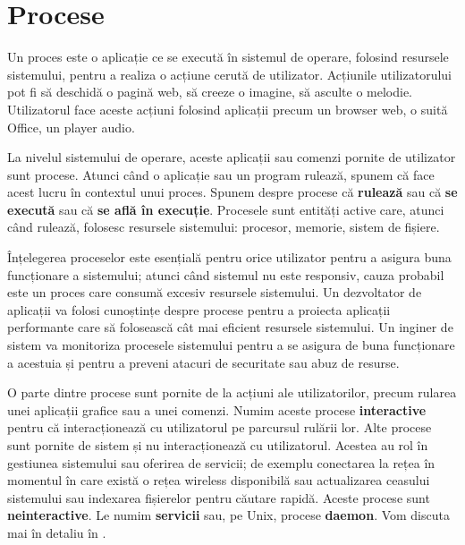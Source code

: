
\chapter{Procese}
\label{ch:process}

Un proces este o aplicație ce se execută în sistemul de operare, folosind resursele sistemului, pentru a realiza o acțiune cerută de utilizator.
Acțiunile utilizatorului pot fi să deschidă o pagină web, să creeze o imagine, să asculte o melodie.
Utilizatorul face aceste acțiuni folosind aplicații precum un browser web, o suită Office, un player audio.

La nivelul sistemului de operare, aceste aplicații sau comenzi pornite de utilizator sunt procese.
Atunci când o aplicație sau un program rulează, spunem că face acest lucru în contextul unui proces.
Spunem despre procese că \textbf{rulează} sau că \textbf{se execută} sau că \textbf{se află în execuție}.
Procesele sunt entități active care, atunci când rulează, folosesc resursele sistemului: procesor, memorie, sistem de fișiere.

Înțelegerea proceselor este esențială pentru orice utilizator pentru a asigura buna funcționare a sistemului;
atunci când sistemul nu este responsiv, cauza probabil este un proces care consumă excesiv resursele sistemului.
Un dezvoltator de aplicații va folosi cunoștințe despre procese pentru a proiecta aplicații performante care să folosească cât mai eficient resursele sistemului.
Un inginer de sistem va monitoriza procesele sistemului pentru a se asigura de buna funcționare a acestuia și pentru a preveni atacuri de securitate sau abuz de resurse.

O parte dintre procese sunt pornite de la acțiuni ale utilizatorilor, precum rularea unei aplicații grafice sau a unei comenzi.
Numim aceste procese \textbf{interactive} pentru că interacționează cu utilizatorul pe parcursul rulării lor.
Alte procese sunt pornite de sistem și nu interacționează cu utilizatorul.
Acestea au rol în gestiunea sistemului sau oferirea de servicii;
de exemplu conectarea la rețea în momentul în care există o rețea wireless disponibilă sau actualizarea ceasului sistemului sau indexarea fișierelor pentru căutare rapidă.
Aceste procese sunt \textbf{neinteractive}.
Le numim \textbf{servicii} sau, pe Unix, procese \textbf{daemon}.
Vom discuta mai în detaliu în .

